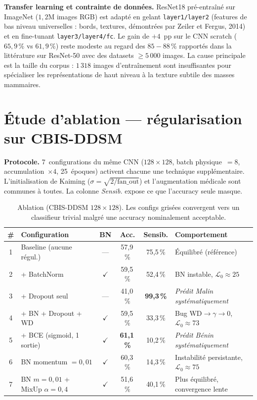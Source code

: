 \documentclass[10pt, a4paper]{article}
\begin{document}
\textbf{Transfer learning et contrainte de données.}
ResNet18 pré-entraîné sur ImageNet ($1{,}2$M images RGB) est adapté en gelant
\texttt{layer1/layer2} (features de bas niveau universelles : bords, textures, démontrées
par Zeiler et Fergus, 2014) et en fine-tunant \texttt{layer3/layer4/fc}.
Le gain de $+4$~pp sur le CNN scratch ($65{,}9\,\%$ vs $61{,}9\,\%$) reste modeste
au regard des $85{-}88\,\%$ rapportés dans la littérature sur ResNet-50 avec des datasets
$\geq 5\,000$ images.
La cause principale est la taille du corpus : $1\,318$ images d'entraînement
sont insuffisantes pour spécialiser les représentations de haut niveau
à la texture subtile des masses mammaires.

\section{Étude d'ablation — régularisation sur CBIS-DDSM}

\textbf{Protocole.}
7~configurations du même CNN ($128{\times}128$, batch physique~$=8$, accumulation~$\times4$,
25~époques) activent chacune une technique supplémentaire.
L'initialisation de Kaiming ($\sigma = \sqrt{2/\text{fan\_out}}$) et l'augmentation
médicale sont communes à toutes. La colonne \emph{Sensib.} expose ce que l'accuracy seule
masque.

\begin{table}[H]
\centering
\caption{Ablation (CBIS-DDSM $128{\times}128$). Les configs grisées convergent vers un
         classifieur trivial malgré une accuracy nominalement acceptable.}
\label{tab:ablation}
\begin{tabular}{clcccp{4.2cm}}
\toprule
\textbf{\#} & \textbf{Configuration} & \textbf{BN} & \textbf{Acc.} & \textbf{Sensib.} & \textbf{Comportement}\\
\midrule
1 & Baseline (aucune régul.)           & —  & 57{,}9\,\% & 75{,}5\,\% & Équilibré (référence) \\
2 & + BatchNorm                        & $\checkmark$  & 59{,}5\,\% & 52{,}4\,\% & BN instable, $\mathcal{L}_0 \approx 25$ \\
3 & + Dropout seul                     & —  & 41{,}0\,\% & \textbf{99{,}3\,\%} & \emph{Prédit Malin systématiquement} \\
4 & + BN + Dropout + WD                & $\checkmark$  & 59{,}5\,\% & 33{,}3\,\% & Bug WD$\to\gamma\to0$, $\mathcal{L}_0 \approx 73$ \\
5 & + BCE (sigmoid, 1 sortie)          & $\checkmark$  & \textbf{61{,}1\,\%} & 10{,}2\,\% & \emph{Prédit Bénin systématiquement} \\
6 & BN momentum $= 0{,}01$             & $\checkmark$  & 60{,}3\,\% & 14{,}3\,\% & Instabilité persistante, $\mathcal{L}_0 \approx 75$ \\
7 & BN $m=0{,}01$ + MixUp $\alpha=0{,}4$ & $\checkmark$ & 51{,}6\,\% & 40{,}1\,\% & Plus équilibré, convergence lente \\
\bottomrule
\end{tabular}
\end{table}
\end{document}
